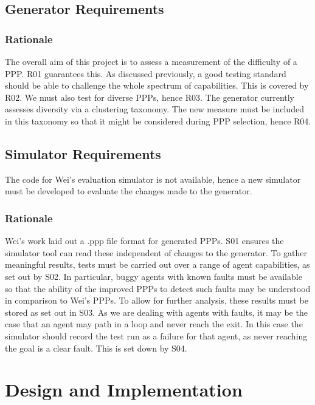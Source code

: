\documentclass[authoryearcitations]{UoYCSproject}
\begin{document}
\section{Generator Requirements}
\label{sec:pa4}
\subsection{Rationale}
\label{sec:pa4_rat}
The overall aim of this project is to assess a measurement of the difficulty of a PPP. R01 guarantees this. As discussed previously, a good testing standard should be able to challenge the whole spectrum of capabilities. This is covered by R02. We must also test for diverse PPPs, hence R03. The generator currently assesses diversity via a clustering taxonomy. The new measure must be included in this taxonomy so that it might be considered during PPP selection, hence R04.

\section{Simulator Requirements}
\label{sec:pa5}
The code for Wei’s evaluation simulator is not available, hence a new simulator must be developed to evaluate the changes made to the generator.

\subsection{Rationale}
\label{sec:pa5_rat}
Wei’s work laid out a .ppp file format for generated PPPs. S01 ensures the simulator tool can read these independent of changes to the generator. To gather meaningful results, tests must be carried out over a range of agent capabilities, as set out by S02. In particular, buggy agents with known faults must be available so that the ability of the improved PPPs to detect such faults may be understood in comparison to Wei’s PPPs. To allow for further analysis, these results must be stored as set out in S03. As we are dealing with agents with faults, it may be the case that an agent may path in a loop and never reach the exit. In this case the simulator should record the test run as a failure for that agent, as never reaching the goal is a clear fault. This is set down by S04.

\chapter{Design and Implementation}
\label{cha:Design}
\end{document}
